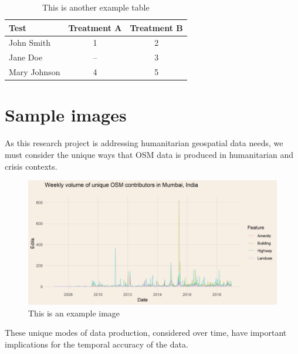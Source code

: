 \begin{table}[ht]
\centering
\caption{This is another example table}
\begin{tabular}[t]{lcc}
\toprule
Test&Treatment A&Treatment B\\
\midrule
John Smith&1&2\\
Jane Doe&--&3\\
Mary Johnson&4&5\\
\bottomrule
\end{tabular}
\end{table}%

\section{Sample images}

As this research project is addressing humanitarian geospatial data needs, we must consider the unique ways that OSM data is produced in humanitarian and crisis contexts. 

\begin{figure} [H] %
    \centering %
    \includegraphics[width = \textwidth]{Images/mb_users_agg.png} %
    \caption{This is an example image} %
    \label{fig:four} %
\end{figure}

These unique modes of data production, considered over time, have important implications for the temporal accuracy of the data. 

